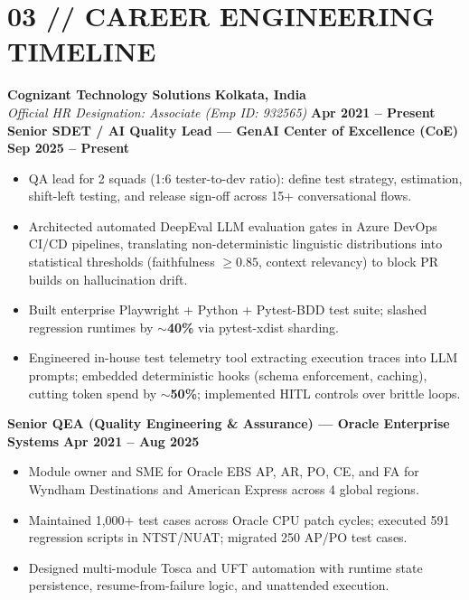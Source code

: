 \documentclass[10pt,a4paper]{article}
\begin{document}
\section*{03 // CAREER ENGINEERING TIMELINE}
\small
\noindent
\textbf{Cognizant Technology Solutions} \hfill \textbf{Kolkata, India}\\
\textit{Official HR Designation: Associate (Emp ID: 932565)} \hfill \textbf{Apr 2021 -- Present}\\[1pt]
\textbf{Senior SDET / AI Quality Lead --- GenAI Center of Excellence (CoE)} \hfill \textbf{Sep 2025 -- Present}
\begin{itemize}[leftmargin=*,noitemsep,topsep=1pt]
    \item QA lead for 2 squads (1:6 tester-to-dev ratio): define test strategy, estimation, shift-left testing, and release sign-off across 15+ conversational flows.
    \item Architected automated DeepEval LLM evaluation gates in Azure DevOps CI/CD pipelines, translating non-deterministic linguistic distributions into statistical thresholds (faithfulness $\ge 0.85$, context relevancy) to block PR builds on hallucination drift.
    \item Built enterprise Playwright + Python + Pytest-BDD test suite; slashed regression runtimes by \textbf{$\sim$40\%} via pytest-xdist sharding.
    \item Engineered in-house test telemetry tool extracting execution traces into LLM prompts; embedded deterministic hooks (schema enforcement, caching), cutting token spend by \textbf{$\sim$50\%}; implemented HITL controls over brittle loops.
\end{itemize}

\vspace{1.5pt}
\noindent
\textbf{Senior QEA (Quality Engineering \& Assurance) --- Oracle Enterprise Systems} \hfill \textbf{Apr 2021 -- Aug 2025}
\begin{itemize}[leftmargin=*,noitemsep,topsep=1pt]
    \item Module owner and SME for Oracle EBS AP, AR, PO, CE, and FA for Wyndham Destinations and American Express across 4 global regions.
    \item Maintained 1,000+ test cases across Oracle CPU patch cycles; executed 591 regression scripts in NTST/NUAT; migrated 250 AP/PO test cases.
    \item Designed multi-module Tosca and UFT automation with runtime state persistence, resume-from-failure logic, and unattended execution.
\end{itemize}
\end{document}
